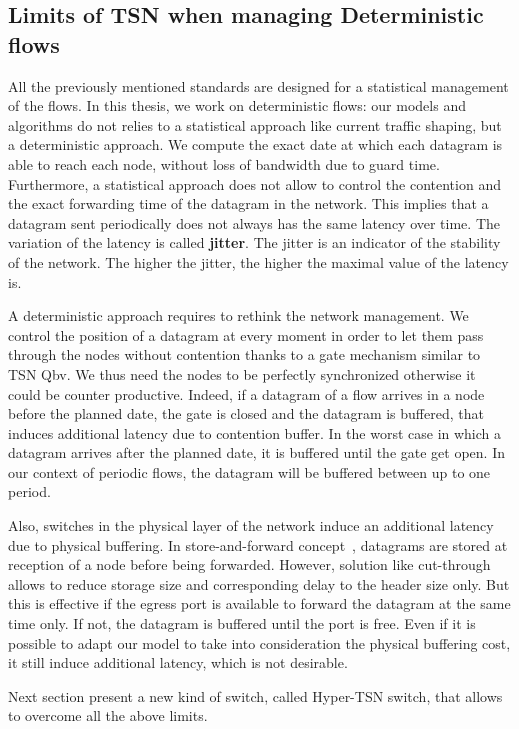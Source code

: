 \subsection{Limits of TSN when managing Deterministic flows}

All the previously mentioned standards are designed for a statistical management of the flows. In this thesis, we work on deterministic flows: our models and algorithms do not relies to a statistical approach like current traffic shaping, but a deterministic approach. We compute the exact date at which each datagram is able to reach each node, without loss of bandwidth due to guard time. Furthermore, a statistical approach does not allow to control the contention and the exact forwarding time of the datagram in the network. This implies that a datagram sent periodically does not always has the same latency over time. The variation of the latency is called \textbf{jitter}. The jitter is an indicator of the stability of the network. The higher the jitter, the higher the maximal value of the latency is.

A deterministic approach requires to rethink the network management. We control the position of a datagram at every moment in order to let them pass through the nodes without contention thanks to a gate mechanism similar to TSN Qbv. We thus need the nodes to be perfectly synchronized otherwise it could be counter productive. Indeed, if a datagram of a flow arrives in a node before the planned date, the gate is closed and the datagram is buffered, that induces additional latency due to contention buffer. In the worst case in which a datagram arrives after the planned date, it is buffered until the gate get open. In our context of periodic flows, the datagram will be buffered between up to one period.

Also, switches in the physical layer of the network induce an additional latency due to physical buffering. In store-and-forward concept~\cite{tindell1992store}, datagrams are stored at reception of a node before being forwarded. However, solution like cut-through~\cite{kermani1979virtual} allows to reduce storage size and corresponding delay to the header size only. But this is effective if the egress port is available to forward the datagram at the same time only. If not, the datagram is buffered until the port is free. Even if it is possible to adapt our model to take into consideration the physical buffering cost, it still induce additional latency, which is not desirable.

Next section present a new kind of switch, called Hyper-TSN switch, that allows to overcome all the above limits.

